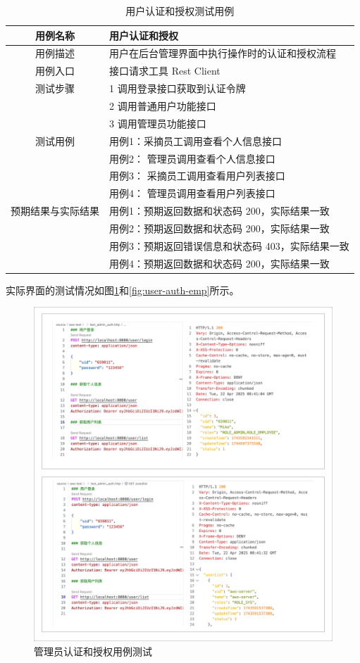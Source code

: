 \begin{longtable}[ht]{|c|p{8cm}|}
\caption{用户认证和授权测试用例}
\label{tab:uc-user-auth-test}
\\
\hline
用例名称 & 用户认证和授权 \\
\hline
用例描述 & 用户在后台管理界面中执行操作时的认证和授权流程 \\
\hline
用例入口 & 接口请求工具 Rest Client \\
\hline
测试步骤 & 1 调用登录接口获取到认证令牌 \\
& 2 调用普通用户功能接口 \\
& 3 调用管理员功能接口 \\
\hline
测试用例 & 用例1：采摘员工调用查看个人信息接口 \\
& 用例2： 管理员调用查看个人信息接口 \\
& 用例3： 采摘员工调用查看用户列表接口 \\
\hline
& 用例4： 管理员调用查看用户列表接口 \\
\hline
预期结果与实际结果 & 用例1：预期返回数据和状态码 200，实际结果一致 \\
\hline
& 用例2：预期返回数据和状态码 200，实际结果一致 \\
& 用例3：预期返回错误信息和状态码 403，实际结果一致 \\
& 用例4：预期返回数据和状态码 200，实际结果一致 \\
\hline
\end{longtable}

实际界面的测试情况如图\ref{fig:user-auth-admin}和\ref{fig:user-auth-emp}所示。

\begin{figure}[H]
    \centering
    \includegraphics[width=0.9\linewidth]{../result/user-auth-admin.png}
    \caption{管理员认证和授权用例测试}
    \label{fig:user-auth-admin}
\end{figure}

